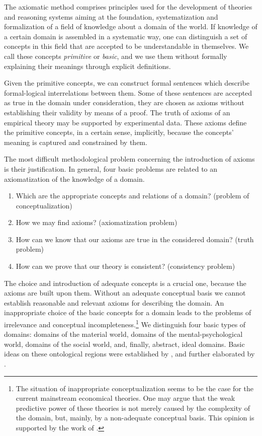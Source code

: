 \documentclass{ao2e}
\begin{document}
The axiomatic method comprises principles used for the development of
theories and reasoning systems aiming at the foundation, systematization and formalization of a field of knowledge about a domain of the world. If knowledge of a certain domain is assembled in a systematic way, one can distinguish a set of concepts in this field that are accepted to be understandable in themselves. We call these concepts {\it primitive} or {\it basic}, and we use them
without formally explaining their meanings through explicit definitions.

Given the primitive concepts, we can construct formal sentences which describe formal-logical interrelations between them. Some of these sentences are accepted as true in the domain under consideration,
they are chosen as axioms without establishing their validity by means of a proof.  The truth of axioms of an empirical theory may be supported by experimental data. These axioms define the primitive concepts, in a certain
sense, implicitly, because the concepts' meaning is captured and constrained by them.

The most difficult methodological problem concerning the introduction of axioms is their justification. In general, four basic problems are related to an axiomatization of the knowledge of a domain.

\begin{enumerate}
\item Which are the appropriate concepts and relations of a domain? \hfill{(problem of conceptualization)} 


\item How we may find axioms? \hfill{(axiomatization problem)}


\item How can we know that our axioms are true in the considered domain? \hfill{(truth problem)}


\item How can we prove that our theory is consistent? \hfill{(consistency problem)}

\end{enumerate}

The choice and introduction of adequate
concepts is a crucial one, because the axioms are built upon them. Without an adequate conceptual basis
we cannot establish reasonable and relevant axioms for describing the domain. An inappropriate choice of the basic concepts for a domain leads to the problems of irrelevance and conceptual incompleteness.\footnote{The situation of inappropriate conceptualization seems to be the case for the current mainstream economical theories. One may argue
that the weak predictive power of these theories is not merely caused by the complexity of the domain, but, 
mainly, by a non-adequate conceptual basis. This opinion is supported by the work of 
\cite{cockshott-w-1997-a, cottrell-a-2007-a}.}
 We distinguish four basic types of domains: domains of the material world, domains of the mental-psychological world, domains of the social world, and, finally, abstract, ideal domains. Basic ideas on 
these ontological regions were established by \cite{hartmann-n-1950-a}, and further elaborated by \cite{poli-r-2001-a}.
\end{document}
